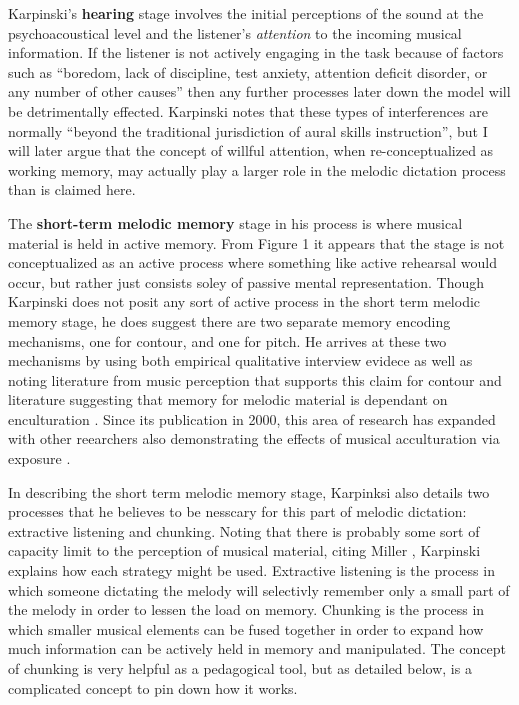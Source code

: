 \documentclass[]{book}
\begin{document}
Karpinski's \textbf{hearing} stage involves the initial perceptions of the sound at the psychoacoustical level and the listener's \emph{attention} to the incoming musical information.
If the listener is not actively engaging in the task because of factors such as ``boredom, lack of discipline, test anxiety, attention deficit disorder, or any number of other causes'' then any further processes later down the model will be detrimentally effected.
Karpinski notes that these types of interferences are normally ``beyond the traditional jurisdiction of aural skills instruction'', but I will later argue that the concept of willful attention, when re-conceptualized as working memory, may actually play a larger role in the melodic dictation process than is claimed here.

The \textbf{short-term melodic memory} stage in his process is where musical material is held in active memory.
From Figure 1 it appears that the stage is not conceptualized as an active process where something like active rehearsal would occur, but rather just consists soley of passive mental representation.
Though Karpinski does not posit any sort of active process in the short term melodic memory stage, he does suggest there are two separate memory encoding mechanisms, one for contour, and one for pitch.
He arrives at these two mechanisms by using both empirical qualitative interview evidece as well as noting literature from music perception that supports this claim for contour \citep{dowlingScaleContourTwo1978, dewittRecognitionNovelMelodies1986} and literature suggesting that memory for melodic material is dependant on enculturation \citep{ouraMemoryMelodiesSubjects1988, handelListeningIntroductionPerception1989, dowlingExpectancyAttentionMelody1990}.
Since its publication in 2000, this area of research has expanded with other reearchers also demonstrating the effects of musical acculturation via exposure \citep{eerolaExpectancySamiYoiks2009, stevensMusicPerceptionCognition2012, pearceAuditoryExpectationInformation2012}.

In describing the short term melodic memory stage, Karpinksi also details two processes that he believes to be nesscary for this part of melodic dictation: extractive listening and chunking.
Noting that there is probably some sort of capacity limit to the perception of musical material, citing Miller \citeyearpar{millerMagicalNumberSeven1956}, Karpinski explains how each strategy might be used.
Extractive listening is the process in which someone dictating the melody will selectivly remember only a small part of the melody in order to lessen the load on memory.
Chunking is the process in which smaller musical elements can be fused together in order to expand how much information can be actively held in memory and manipulated.
The concept of chunking is very helpful as a pedagogical tool, but as detailed below, is a complicated concept to pin down how it works.
\end{document}
